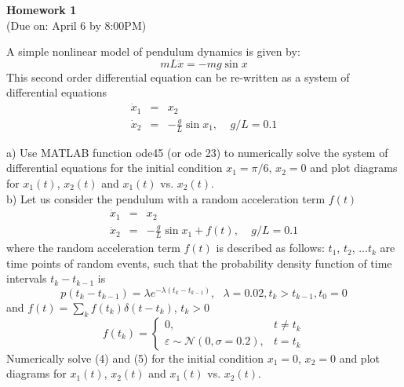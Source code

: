 \documentclass{article}
\begin{document}
 
\begin{center}
{\bf \Large  Homework 1} \\
(Due on: April 6 by 8:00PM)
\end{center}

\noindent A simple nonlinear model of pendulum dynamics is given by:
\begin{equation}
  m L \ddot{x}=-mg \sin x
\end{equation}
This second order differential equation can be re-written as a system of 
differential equations
\begin{eqnarray}
 \dot{x}_1 &=& x_2 \\
 \dot{x}_2 &=& -\frac{g}{L} \sin x_1,\ \ \ \ \ g/L=0.1
\end{eqnarray}

\noindent a) Use MATLAB function ode45 (or ode 23) to numerically solve the system of differential equations for the initial condition $x_1=\pi/6$, $x_2=0$ and plot diagrams for $x_1(t)$, $x_2(t)$ and $x_1(t)$ vs. $x_2(t)$. \\

\noindent b) Let us consider the pendulum with a random acceleration term $f(t)$ 
\begin{eqnarray}
 \dot{x}_1 &=& x_2 \\
 \dot{x}_2 &=& -\frac{g}{L} \sin x_1 + f(t),\ \ \ \ \ g/L=0.1
\end{eqnarray}
where the random acceleration term $f(t)$ is described as follows: $t_1$, $t_2$, ...$t_k$ are time 
points of random events, such that the probability density function of time intervals
$t_k-t_{k-1}$  is 
\begin{equation}
  p(t_{k}-t_{k-1})=\lambda e^{-\lambda(t_k-t_{k-1})},\ \ \ \lambda=0.02,  t_k > t_{k-1}, t_0=0
\end{equation}
and $f(t)=\sum_{k} f(t_k)\delta(t-t_k)$, $t_k>0$
\begin{equation}
 f(t_k) = \left\{ 
  \begin{array}{ll}
    0,& t \ne t_k \\
    \varepsilon \sim \mathcal{N}(0,\sigma=0.2),& t = t_k 
  \end{array} \right.
\end{equation}  
Numerically solve (4) and (5) for the initial condition $x_1=0$, $x_2=0$ and plot diagrams 
for $x_1(t)$, $x_2(t)$ and $x_1(t)$ vs. $x_2(t)$.
\end{document}
